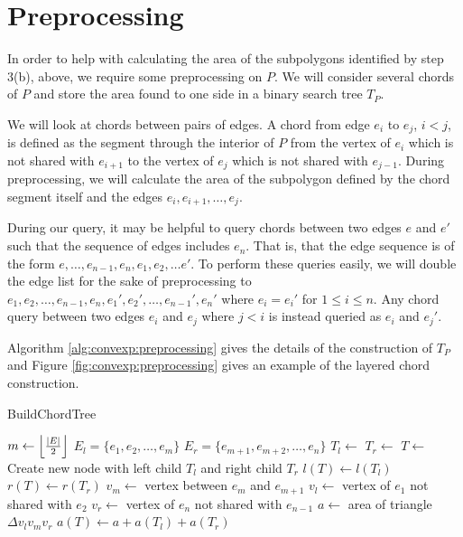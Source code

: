 \section{Preprocessing}
\label{:convexp:preprocessing}

In order to help with calculating the area of the subpolygons identified by step 3(b), above, we require some preprocessing on $P$. We will consider several chords of $P$ and store the area found to one side in a binary search tree $T_P$. 

We will look at chords between pairs of edges. A chord from edge $e_i$ to $e_j$, $i < j$, is defined as the segment through the interior of $P$ from the vertex of $e_i$ which is not shared with $e_{i+1}$ to the vertex of $e_j$ which is not shared with $e_{j-1}$.  During preprocessing, we will calculate the area of the subpolygon defined by the chord segment itself and the edges $e_i, e_{i+1}, \ldots, e_j$.

During our query, it may be helpful to query chords between two edges $e$ and $e'$ such that the sequence of edges includes $e_n$.  That is, that the edge sequence is of the form $e, \ldots, e_{n-1}, e_{n}, e_{1}, e_{2}, \ldots e'$. To perform these queries easily, we will double the edge list for the sake of preprocessing to $e_1, e_2, \ldots, e_{n-1}, e_{n}, e_{1}', e_{2}', \ldots, e_{n-1}', e_n'$ where $e_i = e_i'$ for $1 \leq i \leq n$. Any chord query between two edges $e_i$ and $e_j$ where $j < i$ is instead queried as $e_i$ and $e_j'$.

Algorithm \ref{alg:convexp:preprocessing} gives the details of the construction of $T_P$ and Figure \ref{fig:convexp:preprocessing} gives an example of the layered chord construction.

\begin{algorithm}
\LinesNumbered
\DontPrintSemicolon
\caption{BuildChordTree}
\label{alg:convexp:preprocessing}
\BlankLine
{}
$m \gets \left\lfloor\frac{|E|}{2}\right\rfloor$\;
$E_l = \{ e_1, e_2, \ldots, e_m \}$\;
$E_r = \{ e_{m+1}, e_{m+2}, \ldots, e_n \}$\;
$T_l \gets $ \;
$T_r \gets $ \;
$T \gets $ Create new node with left child $T_l$ and right child $T_r$\;
$l(T) \gets l(T_l)$\;
$r(T) \gets r(T_r)$\;
$v_m \gets $ vertex between $e_m$ and $e_{m+1}$\;
$v_l \gets $ vertex of $e_1$ not shared with $e_2$\;
$v_r \gets $ vertex of $e_n$ not shared with $e_{n-1}$\;
$a \gets $ area of triangle $\Delta v_l v_m v_r$\;
$a(T) \gets a + a(T_l) + a(T_r)$\;
\BlankLine
{}
\end{algorithm}


